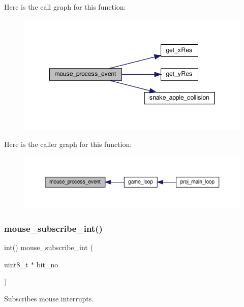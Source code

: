 Here is the call graph for this function\+:
\nopagebreak
\begin{figure}[H]
\begin{center}
\leavevmode
\includegraphics[width=343pt]{group__mouse_gadd8392c6469ceff59d345a3a7ff1027a_cgraph}
\end{center}
\end{figure}
Here is the caller graph for this function\+:
\nopagebreak
\begin{figure}[H]
\begin{center}
\leavevmode
\includegraphics[width=350pt]{group__mouse_gadd8392c6469ceff59d345a3a7ff1027a_icgraph}
\end{center}
\end{figure}
\mbox{\label{group__mouse_ga20285aed4b3ef45812cd967532dd09db}} 
\subsubsection{\texorpdfstring{mouse\+\_\+subscribe\+\_\+int()}{mouse\_subscribe\_int()}}
{\footnotesize\ttfamily int() mouse\+\_\+subscribe\+\_\+int (\begin{DoxyParamCaption}\item[{uint8\+\_\+t $\ast$}]{bit\+\_\+no }\end{DoxyParamCaption})}



Subscribes mouse interrupts. 

